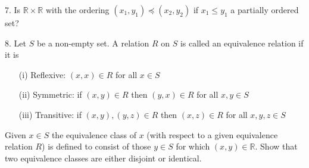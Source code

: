 \documentclass{article}
\theoremstyle{remark} %
\newcommand{\R}{{\mathbb{R}}}
\begin{document}

7. Is $\R \times \R$ with the ordering $(x_1,y_1) \preceq (x_2,y_2)$ if $x_1 \leq y_1$ a partially ordered set? 

\vspace{8cm} %




8. Let $S$ be a non-empty set. A relation $R$ on $S$ is called an equivalence relation if it is
    \begin{enumerate}
        \item[(i)] Reflexive: $(x,x) \in R$ for all $x \in S$
        \item[(ii)] Symmetric: if $(x,y) \in R$  then $(y,x) \in R$ for all $x,y \in S$
        \item[(iii)] Transitive: if $(x,y), (y,z) \in R$ then $(x,z) \in R$ for all $x,y,z \in S$
    \end{enumerate}
Given $x \in S$ the equivalence class of $x$ (with respect to a given equivalence relation $R$) is defined to consist of those $y \in S$ for which $(x,y) \in \R$. Show that two equivalence classes are either disjoint or identical.

\vspace{11cm} %

\end{document}
